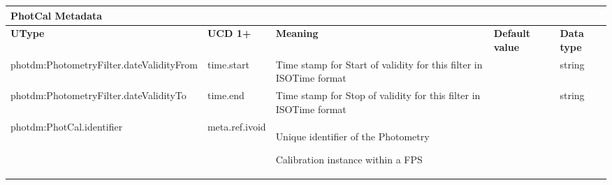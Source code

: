 \documentclass[11pt,a4paper]{ivoa}
\begin{document}
\begin{appendices}



\newpage



\begin{table}[H]
\centering
\begin{adjustbox}{angle=90}
\begin{tabular}{p{2.5in}|p{1.5in}|p{2in}|p{0.74in}|p{0.35in}}
\multicolumn{5}{p{\dimexpr6.59in+8\tabcolsep\relax}}{\centering
{\fontsize{10pt}{12.0pt}\selectfont \textbf{PhotCal Metadata}}} \\
\hline
\multicolumn{1}{p{2.5in}}{{\fontsize{8pt}{8pt}\selectfont \textbf{UType}}} &
\multicolumn{1}{p{1.5in}}{{\fontsize{8pt}{8pt}\selectfont \textbf{UCD 1+}}} &
\multicolumn{1}{p{2in}}{{\fontsize{8pt}{8pt}\selectfont \textbf{Meaning}}} &
\multicolumn{1}{p{0.74in}}{{\fontsize{8pt}{8pt}\selectfont \textbf{Default value}}} &
\multicolumn{1}{p{0.35in}}{{\fontsize{8pt}{8pt}\selectfont \textbf{Data type}}} \\
\hline
\multicolumn{1}{p{2.5in}}{{\fontsize{8pt}{8pt}\selectfont photdm:PhotometryFilter.dateValidityFrom}} &
\multicolumn{1}{p{1.5in}}{{\fontsize{8pt}{8pt}\selectfont time.start}} &
\multicolumn{1}{p{2in}}{{\fontsize{8pt}{8pt}\selectfont Time stamp for Start of validity for
this filter in ISOTime format }} &
\multicolumn{1}{p{0.74in}}{} &
\multicolumn{1}{p{0.35in}}{{\fontsize{8pt}{8pt}\selectfont string }} \\
\hline
\multicolumn{1}{p{2.5in}}{{\fontsize{8pt}{8pt}
\selectfont photdm:PhotometryFilter.dateValidityTo}} &
\multicolumn{1}{p{1.5in}}{{\fontsize{8pt}{8pt}\selectfont time.end}} &
\multicolumn{1}{p{2in}}{{\fontsize{8pt}{8pt}\selectfont Time stamp for Stop of validity
for this filter in ISOTime format }} &
\multicolumn{1}{p{0.74in}}{} &
\multicolumn{1}{p{0.35in}}{{\fontsize{8pt}{8pt}\selectfont string }} \\
\hline
\multicolumn{1}{p{2.5in}}{{\fontsize{8pt}{8pt}\selectfont photdm:PhotCal.identifier}} &
\multicolumn{1}{p{1.5in}}{{\fontsize{8pt}{8pt}\selectfont meta.ref.ivoid }} &
\multicolumn{1}{p{2in}}{{\fontsize{8pt}{8pt}\selectfont Unique identifier of the Photometry }
\par {\fontsize{8pt}{8pt}\selectfont Calibration instance within a FPS}} &
\multicolumn{1}{p{0.74in}}{} &

\end{tabular}
\end{adjustbox}
\end{table}
\end{appendices}
\end{document}
